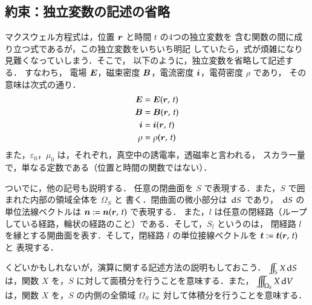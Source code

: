         \subsection{約束：独立変数の記述の省略}
                マクスウェル方程式は，位置 $\boldsymbol{r}$ と時間 $t$ の4つの独立変数を
                含む関数の間に成り立つ式であるが，この独立変数をいちいち明記
                していたら，式が煩雑になり見難くなっていしまう．そこで，
                以下のように，独立変数を省略して記述する．
                すなわち，
                電場 $\boldsymbol{E}$，磁束密度 $\boldsymbol{B}$，電流密度 $\boldsymbol{i}$，電荷密度 $\rho$ であり，
                その意味は次式の通り．
                    \begin{align*}
                        \boldsymbol{E}  &= \boldsymbol{E}(\boldsymbol{r},\,t) \\
                        \boldsymbol{B}  &= \boldsymbol{B}(\boldsymbol{r},\,t) \\
                        \boldsymbol{i}  &= \boldsymbol{i}(\boldsymbol{r},\,t) \\
                        \rho &= \rho(\boldsymbol{r},\,t)
                    \end{align*}
                また，$\varepsilon_{0}$，$\mu_{0}$ は，それぞれ，真空中の誘電率，透磁率と言われる，
                スカラー量で，単なる定数である（位置と時間の関数ではない）．

                ついでに，他の記号も説明する．
                任意の閉曲面を $S$ で表現する．また，$S$ で囲まれた内部の領域全体を $\Omega_{S}$ と
                書く．閉曲面の微小部分は $\,\mathrm{d} S$ であり，
                $\,\mathrm{d} S$ の単位法線ベクトルは $\boldsymbol{n}:=\boldsymbol{n}(\boldsymbol{r},\,t)$ で表現する．
                また，$l$ は任意の閉経路（ループしている経路，輪状の経路のこと）である．そして，$S_{l}$ というのは，
                閉経路 $l$ を縁とする開曲面を表す．そして，閉経路 $l$ の単位接線ベクトルを $\boldsymbol{t}:=\boldsymbol{t}(\boldsymbol{r},\,t)$ と
                表現する．

                くどいかもしれないが，演算に関する記述方法の説明もしておこう．
                $\int\mspace{-11mu}\int_{S} X\,\mathrm{d} S$ は，関数 $X$ を，$S$ に対して面積分を行うことを意味する．また，
                $\int\mspace{-11mu}\int\mspace{-11mu}\int_{\Omega_{S}} X \,\mathrm{d} V$ は，関数 $X$ を，$S$ の内側の全領域 $\Omega_{S}$ に
                対して体積分を行うことを意味する．

